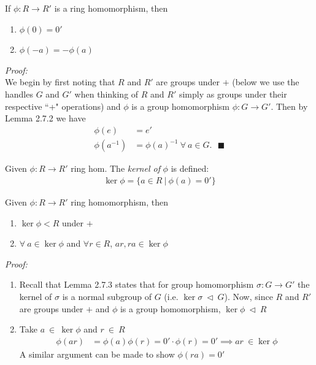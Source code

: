 \begin{lemma} 
If $\phi : R\rightarrow R'$ is a ring homomorphism, then
\begin{enumerate}
    \item $\phi(0)=0'$
    \item $\phi(-a)=-\phi(a)$
\end{enumerate}
\textit{Proof:}\\
We begin by first noting that $R$ and $R'$ are groups under $+$ (below we use the handles $G$ and $G'$ when thinking of $R$ and $R'$ simply as groups under their respective ``+" operations) and $\phi$ is a group homomorphism $\phi:G \rightarrow G'$. Then by Lemma 2.7.2 we have
\begin{align}
    \phi(e)&=e' \nonumber \\
    \phi(a^{-1}) &= \phi(a)^{-1} \ \forall \ a \in G. \ \ \ \blacksquare \nonumber
\end{align}
\end{lemma}

\begin{definition} 
Given $\phi:R\rightarrow R'$ ring hom. The \textit{kernel of} $\phi$ is defined:
\begin{align}
    \ker \phi = \{ a \in R \ | \ \phi(a)=0'\} \nonumber
\end{align}
\end{definition}

\begin{lemma}
Given $\phi: R \rightarrow R'$ ring homomorphism, then
\begin{enumerate}[label=\roman*)]
    \item $\ker \phi < R$ under $+$
    \item $\forall \ a \in \ker \phi $ and $\forall r \in R$, $ar, ra \in \ker\phi$
\end{enumerate}
\textit{Proof:}\\
\begin{enumerate}[label=\roman*)]
    \item Recall that Lemma 2.7.3 states that for group homomorphism $\sigma : G \rightarrow G'$ the kernel of $\sigma$ is a normal subgroup of $G$ (i.e. $\ker{\sigma} \ \triangleleft \ G$). Now, since $R$ and $R'$ are groups under $+$ and $\phi$ is a group homomorphism, $\ker{\phi} \ \triangleleft \ R$
    \item Take $a \ \in \ \ker{\phi} $ and $r \ \in \ R$
    \begin{align}
        \phi(ar) &= \phi(a)\phi(r) = 0' \cdot \phi(r)=0' \implies ar \ \in \ker{\phi} \nonumber
    \end{align}
    A similar argument can be made to show $\phi(ra)=0'$
\end{enumerate}

\end{lemma}

